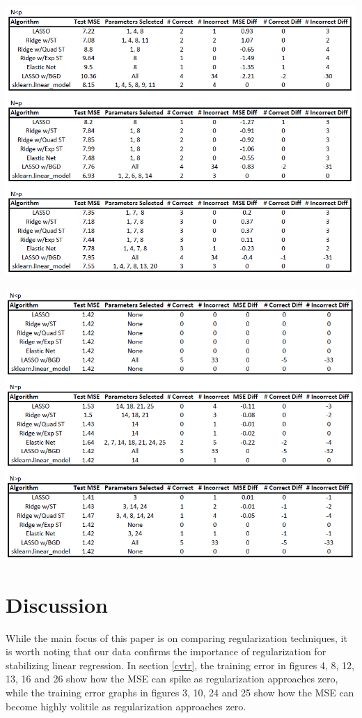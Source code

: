 \documentclass[11pt]{article}
\begin{document}
\begin{center}
\includegraphics[scale=0.7]{ortho.PNG}
\end{center}

\begin{center}
\includegraphics[scale=0.7]{corr.PNG}
\end{center}


\section{Discussion}
While the main focus of this paper is on comparing regularization techniques, it is worth noting that our data confirms the importance of regularization for stabilizing linear regression.  In section \ref{cvtr}, the training error in figures 4, 8, 12, 13, 16 and 26 show how the MSE can spike as regularization approaches zero, while the training error graphs in figures 3, 10, 24 and 25 show how the MSE can become highly volitile as regularization approaches zero.  \\
\end{document}
